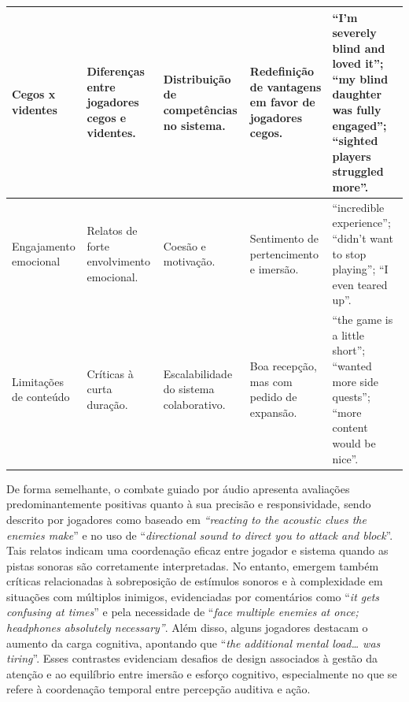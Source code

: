\documentclass[12pt]{article}
\begin{document}
{{\begin{table}[H]
\begin{tabular}{|p{2.2cm}|p{2.6cm}|p{2.5cm}|p{2.5cm}|p{3.6cm}|}
Cegos x videntes &
Diferenças entre jogadores cegos e videntes. &
Distribuição de competências no sistema. &
Redefinição de vantagens em favor de jogadores cegos. &
“I’m severely blind and loved it”; “my blind daughter was fully engaged”; “sighted players struggled more”. \\
\hline

Engajamento emocional &
Relatos de forte envolvimento emocional. &
Coesão e motivação. &
Sentimento de pertencimento e imersão. &
“incredible experience”; “didn’t want to stop playing”; “I even teared up”. \\
\hline

Limitações de conteúdo &
Críticas à curta duração. &
Escalabilidade do sistema colaborativo. &
Boa recepção, mas com pedido de expansão. &
“the game is a little short”; “wanted more side quests”; “more content would be nice”. \\
\hline

\end{tabular}
\end{table}


De forma semelhante, o combate guiado por áudio apresenta avaliações predominantemente positivas quanto à sua precisão e responsividade, sendo descrito por jogadores como baseado em \textit{“reacting to the acoustic clues the enemies make}” e no uso de “\textit{directional sound to direct you to attack and block}”. Tais relatos indicam uma coordenação eficaz entre jogador e sistema quando as pistas sonoras são corretamente interpretadas. No entanto, emergem também críticas relacionadas à sobreposição de estímulos sonoros e à complexidade em situações com múltiplos inimigos, evidenciadas por comentários como “\textit{it gets confusing at times}” e pela necessidade de “\textit{face multiple enemies at once; headphones absolutely necessary”}. Além disso, alguns jogadores destacam o aumento da carga cognitiva, apontando que “\textit{the additional mental load… was tiring}”. Esses contrastes evidenciam desafios de design associados à gestão da atenção e ao equilíbrio entre imersão e esforço cognitivo, especialmente no que se refere à coordenação temporal entre percepção auditiva e ação.


}}
\end{document}
